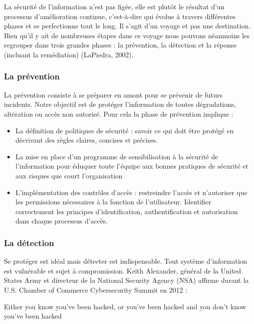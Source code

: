 \documentclass[
  11pt,
  a4paper,
  krantz2,
  11pt,
  oneside]{krantz}
\renewenvironment{quote}{\begin{VF}}{\end{VF}}
\begin{document}
La sécurité de l'information n'est pas figée, elle est plutôt le résultat d'un processus d'amélioration continue, c'est-à-dire qui évolue à travers différentes phases et se perfectionne tout le long. Il s'agit d'un voyage et pas une destination. Bien qu'il y ait de nombreuses étapes dans ce voyage nous pouvons néanmoins les regrouper dans trois grandes phases : la prévention, la détection et la réponse (incluant la remédiation) (LaPiedra, 2002).

\subsubsection{La prévention}\label{la-pruxe9vention}

La prévention consiste à se préparer en amont pour se prévenir de futurs incidents. Notre objectif est de protéger l'information de toutes dégradations, altération ou accès non autorisé. Pour cela la phase de prévention implique :

\begin{itemize}
\item
  La définition de politiques de sécurité : savoir ce qui doit être protégé en décrivant des règles claires, concises et précises.
\item
  La mise en place d'un programme de sensibilisation à la sécurité de l'information pour éduquer toute l'équipe aux bonnes pratiques de sécurité et aux risques que court l'organisation
\item
  L'implémentation des contrôles d'accès : restreindre l'accès et n'autoriser que les permissions nécessaires à la fonction de l'utilisateur. Identifier correctement les principes d'identification, authentification et autorisation dans chaque processus d'accès.
\end{itemize}

\subsubsection{La détection}\label{la-duxe9tection}

Se protéger est idéal mais détecter est indispensable. Tout système d'information est vulnérable et sujet à compromission. Keith Alexander, général de la United States Army et directeur de la National Security Agency (NSA) affirme durant la U.S. Chamber of Commerce Cybersecurity Summit en 2012 :

\begin{quote}
Either you know you've been hacked, or you've been hacked and you don't know you've been hacked
\end{quote}
\end{document}
